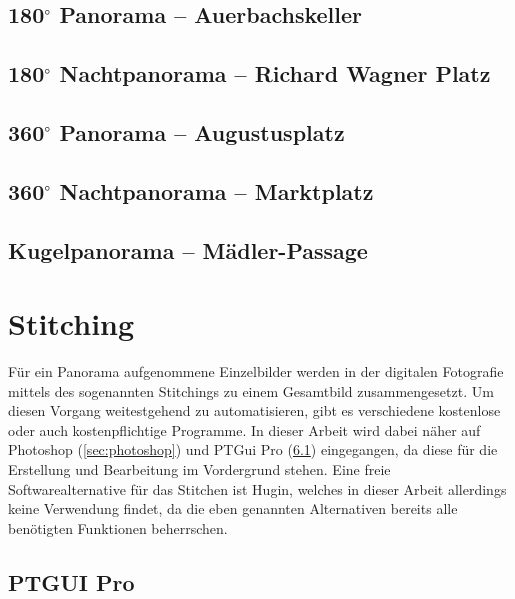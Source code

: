 \documentclass[liststotoc,bibtotoc,fontsize=14pt,]{scrreprt}
\begin{document}
	
	\section{180$^\circ$ Panorama -- Auerbachskeller}
	\label{sec:auer}

	\section{180$^\circ$ Nachtpanorama -- Richard Wagner Platz}
	\label{sec:wagner}
	
	\section{360$^\circ$ Panorama -- Augustusplatz}
	\label{sec:augustus}
	
	\section{360$^\circ$ Nachtpanorama -- Marktplatz}
	\label{sec:markt}
	
	\section{Kugelpanorama --  Mädler-Passage}
	\label{sec:kugel}
	
	\chapter{Stitching}
	\label{ch:stitiching}
	Für ein Panorama aufgenommene Einzelbilder werden in der digitalen Fotografie mittels des sogenannten Stitchings zu einem Gesamtbild zusammengesetzt. Um diesen Vorgang weitestgehend zu automatisieren, gibt es verschiedene kostenlose oder auch kostenpflichtige Programme. In dieser Arbeit wird dabei näher auf Photoshop (\ref{sec:photoshop}) und PTGui Pro (\ref{sec:ptgui}) eingegangen, da diese für die Erstellung und Bearbeitung im Vordergrund stehen. Eine freie Softwarealternative für das Stitchen ist Hugin, welches in dieser Arbeit allerdings keine Verwendung findet, da die eben genannten Alternativen bereits alle benötigten Funktionen beherrschen.
	
	\section{PTGUI Pro}
	\label{sec:ptgui}
	
\end{document}
